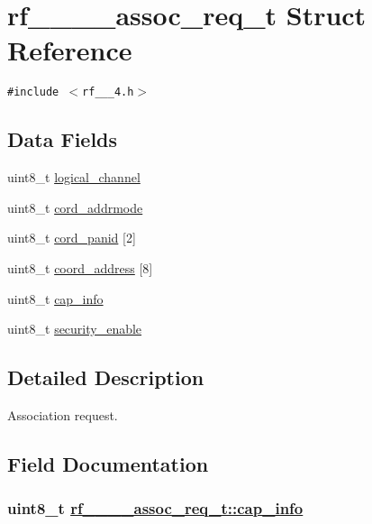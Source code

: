 \hypertarget{structrf__802__15__4__assoc__req__t}{
\section{rf\_\_\_\_\-assoc\_\-req\_\-t Struct Reference}
\label{structrf__802__15__4__assoc__req__t}
}
{\tt \#include $<$rf\_\_\_\-4.h$>$}

\subsection*{Data Fields}
\begin{CompactItemize}
\item 
uint8\_\-t \hyperlink{structrf__802__15__4__assoc__req__t_fcfe7e9969125cb656aaf65778e130a7}{logical\_\-channel}
\item 
uint8\_\-t \hyperlink{structrf__802__15__4__assoc__req__t_cfc3ef092d3cccf0b16fccfabfd73254}{cord\_\-addrmode}
\item 
uint8\_\-t \hyperlink{structrf__802__15__4__assoc__req__t_6ef014ac1fe8af11db0b0b73d8e6de99}{cord\_\-panid} \mbox{[}2\mbox{]}
\item 
uint8\_\-t \hyperlink{structrf__802__15__4__assoc__req__t_294ed6e2e6aa5baa4908f39f3dd26b9f}{coord\_\-address} \mbox{[}8\mbox{]}
\item 
uint8\_\-t \hyperlink{structrf__802__15__4__assoc__req__t_c3fa6e34dd008a9fd04ef877a3127e40}{cap\_\-info}
\item 
uint8\_\-t \hyperlink{structrf__802__15__4__assoc__req__t_271943aeb65f1e9b6f872e209c631416}{security\_\-enable}
\end{CompactItemize}


\subsection{Detailed Description}
Association request. 



\subsection{Field Documentation}
\hypertarget{structrf__802__15__4__assoc__req__t_c3fa6e34dd008a9fd04ef877a3127e40}{
\subsubsection[cap\_\-info]{\setlength{\rightskip}{0pt plus 5cm}uint8\_\-t \hyperlink{structrf__802__15__4__assoc__req__t_c3fa6e34dd008a9fd04ef877a3127e40}{rf\_\_\_\_\-assoc\_\-req\_\-t::cap\_\-info}}}
\label{structrf__802__15__4__assoc__req__t_c3fa6e34dd008a9fd04ef877a3127e40}


